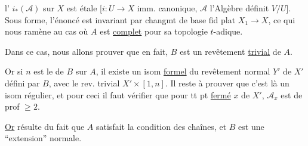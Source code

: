 

l' $i_*(\mathscr A)$ sur $X$ est étale [$i:U\longrightarrow X$
imm. canonique, $\mathscr A$ l'Algèbre   définit
$V/U$]. Sous  forme, l'énoncé est
invariant par  changmt de base fid plat
  $X_1\longrightarrow X$, ce qui nous ramène
au cas où $A$ est \uline{complet}  pour sa
 topologie $t$-adique.



Dans ce cas, nous allons prouver que en
fait, $B$ est un revêtement \uline{trivial} de $A$.

Or  \unsure{,} si $n$ est le   de $B$ sur $A$,
il existe un isom \uline{formel} du
revêtement normal $Y'$ de $X'$ défini par $B$,
avec le rev. trivial $X'\times[1,n]$. Il
reste à prouver que c'est là un
isom régulier, et pour ceci il 
faut vérifier que pour tt pt \uline{fermé}
$x$ de $X'$,  $\mathscr A_x$ est de prof $\geq 2$.


\uline{Or}  résulte du fait que $A$
satisfait la condition des chaînes, et $B$
est une ``extension'' normale.

